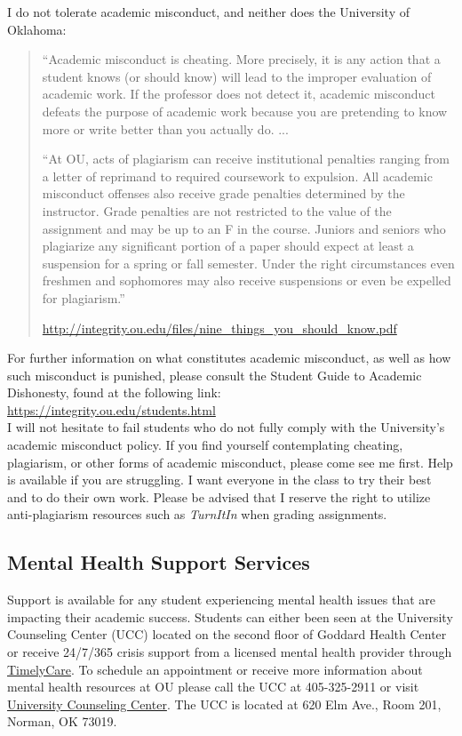 \documentclass[11pt,english]{article}
\begin{document}
I do not tolerate academic misconduct, and neither does the University of Oklahoma: 
\begin{quotation}
``Academic misconduct is cheating. More precisely, it is any action that a student knows (or should know) will lead to the improper evaluation of academic work. If the professor does not detect it, academic misconduct defeats the purpose of academic work because you are pretending to know more or write better than you actually do. ... 

``At OU, acts of plagiarism can receive institutional penalties ranging from a letter of reprimand to required coursework to expulsion. All academic misconduct offenses also receive grade penalties determined by the instructor. Grade penalties are not restricted to the value of the assignment and may be up to an F in the course. Juniors and seniors who plagiarize any significant portion of a paper should expect at least a suspension for a spring or fall semester. Under the right circumstances even freshmen and sophomores may also receive suspensions or even be expelled for plagiarism.'' 

\textemdash \url{http://integrity.ou.edu/files/nine_things_you_should_know.pdf}
\end{quotation}
For further information on what constitutes academic misconduct, as well as how such misconduct is punished, please consult the Student Guide to Academic Dishonesty, found at the following link:\\ \url{https://integrity.ou.edu/students.html}\\

I will not hesitate to fail students who do not fully comply with the University's academic misconduct policy. If you find yourself contemplating cheating, plagiarism, or other forms of academic misconduct, please come see me first. Help is available if you are struggling. I want everyone in the class to try their best and to do their own work. Please be advised that I reserve the right to utilize anti-plagiarism resources such as \emph{TurnItIn} when grading assignments.

\subsection*{Mental Health Support Services}

Support is available for any student experiencing mental health issues that are impacting their academic success. Students can either been seen at the University Counseling Center (UCC) located on the second floor of Goddard Health Center or receive 24/7/365 crisis support from a licensed mental health provider through \href{https://www.ou.edu/studentaffairs/resources/timelycare}{TimelyCare}. To schedule an appointment or receive more information about mental health resources at OU please call the UCC at 405-325-2911 or visit \href{https://www.ou.edu/ucc}{University Counseling Center}. The UCC is located at 620 Elm Ave., Room 201, Norman, OK 73019.
\end{document}
